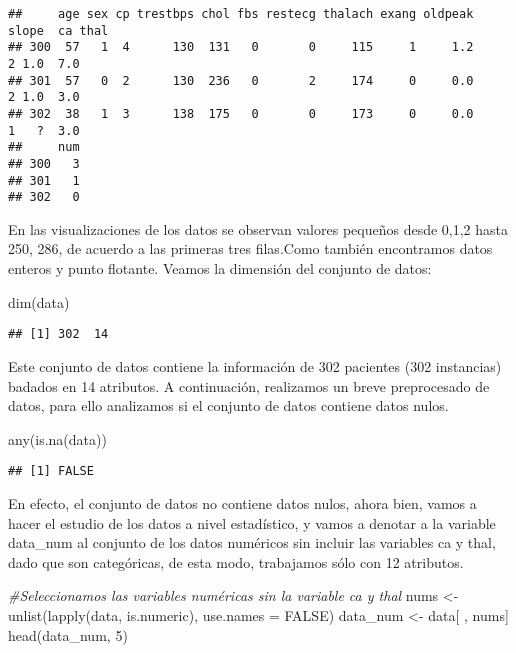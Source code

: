 \documentclass[
]{article}
\newenvironment{Shaded}{\begin{snugshade}}{\end{snugshade}}
\newcommand{\AttributeTok}[1]{\textcolor[rgb]{0.77,0.63,0.00}{#1}}
\newcommand{\CommentTok}[1]{\textcolor[rgb]{0.56,0.35,0.01}{\textit{#1}}}
\newcommand{\ConstantTok}[1]{\textcolor[rgb]{0.00,0.00,0.00}{#1}}
\newcommand{\DecValTok}[1]{\textcolor[rgb]{0.00,0.00,0.81}{#1}}
\newcommand{\FunctionTok}[1]{\textcolor[rgb]{0.00,0.00,0.00}{#1}}
\newcommand{\NormalTok}[1]{#1}
\newcommand{\OtherTok}[1]{\textcolor[rgb]{0.56,0.35,0.01}{#1}}
\begin{document}
\begin{verbatim}
##     age sex cp trestbps chol fbs restecg thalach exang oldpeak slope  ca thal
## 300  57   1  4      130  131   0       0     115     1     1.2     2 1.0  7.0
## 301  57   0  2      130  236   0       2     174     0     0.0     2 1.0  3.0
## 302  38   1  3      138  175   0       0     173     0     0.0     1   ?  3.0
##     num
## 300   3
## 301   1
## 302   0
\end{verbatim}

En las visualizaciones de los datos se observan valores pequeños desde
0,1,2 hasta 250, 286, de acuerdo a las primeras tres filas.Como también
encontramos datos enteros y punto flotante. Veamos la dimensión del
conjunto de datos:

\begin{Shaded}
\begin{Highlighting}[]
\FunctionTok{dim}\NormalTok{(data)}
\end{Highlighting}
\end{Shaded}

\begin{verbatim}
## [1] 302  14
\end{verbatim}

Este conjunto de datos contiene la información de 302 pacientes (302
instancias) badados en 14 atributos. A continuación, realizamos un breve
preprocesado de datos, para ello analizamos si el conjunto de datos
contiene datos nulos.

\begin{Shaded}
\begin{Highlighting}[]
\FunctionTok{any}\NormalTok{(}\FunctionTok{is.na}\NormalTok{(data))}
\end{Highlighting}
\end{Shaded}

\begin{verbatim}
## [1] FALSE
\end{verbatim}

En efecto, el conjunto de datos no contiene datos nulos, ahora bien,
vamos a hacer el estudio de los datos a nivel estadístico, y vamos a
denotar a la variable data\_num al conjunto de los datos numéricos sin
incluir las variables ca y thal, dado que son categóricas, de esta modo,
trabajamos sólo con 12 atributos.

\begin{Shaded}
\begin{Highlighting}[]
\CommentTok{\#Seleccionamos las variables numéricas sin la variable ca y thal}
\NormalTok{nums }\OtherTok{\textless{}{-}} \FunctionTok{unlist}\NormalTok{(}\FunctionTok{lapply}\NormalTok{(data, is.numeric), }\AttributeTok{use.names =} \ConstantTok{FALSE}\NormalTok{) }
\NormalTok{data\_num }\OtherTok{\textless{}{-}}\NormalTok{ data[ , nums]}
\FunctionTok{head}\NormalTok{(data\_num, }\DecValTok{5}\NormalTok{)}
\end{Highlighting}
\end{Shaded}
\end{document}
